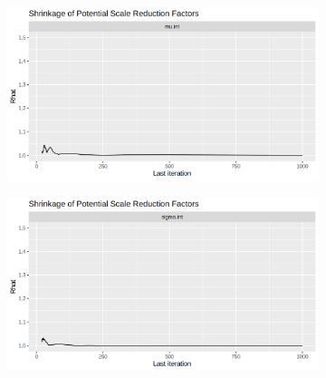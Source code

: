\documentclass[12pt]{article}
\begin{document}
\begin{figure}[h!]
    \centering
    \begin{subfigure}{0.45\textwidth}
        \includegraphics[width=\linewidth]{pictures/mod2/mod2gbr_muint.png}
    \end{subfigure}
    \begin{subfigure}{0.45\textwidth}
        \includegraphics[width=\linewidth]{pictures/mod2/mod2gbr_sigmaint.png}
    \end{subfigure}


\end{figure}
\end{document}
